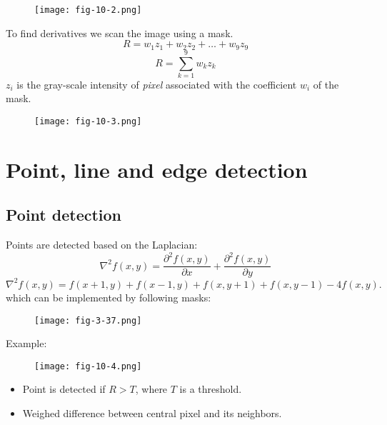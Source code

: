 \begin{frame}
\begin{figure}[!h]
\texttt{[image: fig-10-2.png]}
\end{figure}
\end{frame}

\begin{frame}
To find derivatives we scan the image using a mask.
\[
R = w_{1}z_{1} + w_{2}z_{2} + \ldots	+ w_{9}z_{9}
\]
\[
R = \sum_{k=1}^{9} w_{k}z_{k}
\]
$z_{i}$ is the gray-scale intensity of \textit{pixel} associated with the coefficient $w_{i}$ of the mask.
\begin{figure}[!h]
\texttt{[image: fig-10-3.png]}
\end{figure}
\end{frame}

\section{Point, line and edge detection}

\subsection{Point detection}

\begin{frame}
Points are detected based on the Laplacian:
\[
\nabla^{2} f(x,y) = \dfrac{\partial^{2}f(x,y)}{\partial x} + \dfrac{\partial^{2} f(x,y)}{\partial y}
\]
\begin{equation}
\nabla^{2} f(x,y) = f(x+1,y) + f(x-1,y) + f(x,y+1) + f(x,y-1) - 4f(x,y).
\end{equation}
which can be implemented by following masks:
\begin{figure}[!h]
\texttt{[image: fig-3-37.png]}
\end{figure}
\end{frame}

\begin{frame}
Example:
\begin{figure}[!h]
\texttt{[image: fig-10-4.png]}
\end{figure}
\begin{itemize}
\item Point is detected if $R>T$, where $T$ is a threshold.
\item Weighed difference between central pixel and its neighbors.
\end{itemize}
\end{frame}


